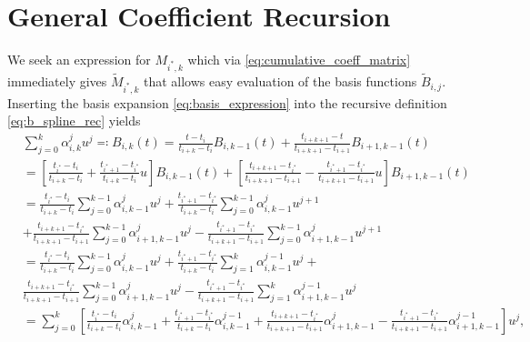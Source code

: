 \section{General Coefficient Recursion}

We seek an expression for $M_{i^*, k}$ which via \eqref{eq:cumulative_coeff_matrix} immediately gives $\tilde M_{i^*, k}$ that allows easy evaluation of the basis functions $\tilde B_{i,j}$. Inserting the basis expansion \eqref{eq:basis_expression} into the recursive definition \eqref{eq:b_spline_rec} yields
\begin{equation*}
  \begin{aligned}
     & \sum_{j=0}^k \alpha^j_{i, k} u^j  \eqcolon B_{i, k}(t) = \frac{t - t_i}{t_{i+k} - t_i} B_{i, k-1}(t) + \frac{t_{i+k+1} - t}{t_{i+k+1} - t_{i+1}} B_{i+1, k-1}(t)                                                                                                                                                                                                \\
     & = \left[\frac{t_{i^*} - t_i}{t_{i+k} - t_i} + \frac{t_{i^*+1} - t_{i^*}}{t_{i+k} - t_i} u \right] B_{i, k-1}(t) + \left[ \frac{t_{i+k+1} - t_{i^*}}{t_{i+k+1} - t_{i+1} } - \frac{t_{i^*+1}-t_{i^*}}{t_{i+k+1} - t_{i+1}} u \right] B_{i+1, k-1}(t)                                                                                                             \\
     & = \frac{t_{i^*} - t_i}{t_{i+k} - t_i} \sum_{j=0}^{k-1} \alpha_{i, k-1}^{j} u^j +  \frac{t_{i^*+1}-t_{i^*}} {t_{i+k} - t_{i}} \sum_{j=0}^{k-1} \alpha^{j}_{i, k-1} u^{j+1}\\
     & + \frac{t_{i+k+1}-t_{i^*}}{t_{i+k+1} - t_{i+1}} \sum_{j=0}^{k-1} \alpha^j_{i+1,k-1} u^{j} - \frac{t_{i^*+1}-t_{i^*}}{t_{i+k+1} - t_{i+1}} \sum_{j=0}^{k-1} \alpha^j_{i+1,k-1} u^{j+1} \\
     & = \frac{t_{i^*} - t_i}{t_{i+k} - t_i} \sum_{j=0}^{k-1} \alpha_{i, k-1}^{j} u^j +  \frac{t_{i^*+1}-t_{i^*}} {t_{i+k} - t_{i}} \sum_{j=1}^{k} \alpha^{j-1}_{i, k-1} u^{j} + \\
     & \frac{t_{i+k+1}-t_{i^*}}{t_{i+k+1} - t_{i+1}} \sum_{j=0}^{k-1} \alpha^j_{i+1,k-1} u^{j} - \frac{t_{i^*+1}-t_{i^*}}{t_{i+k+1} - t_{i+1}} \sum_{j=1}^{k} \alpha^{j-1}_{i+1,k-1} u^{j}   \\
     & = \sum_{j=0}^k \left[ \frac{t_{i^*} - t_i}{t_{i+k} - t_i} \alpha_{i, k-1}^{j} + \frac{t_{i^*+1}-t_{i^*}} {t_{i+k} - t_{i}}  \alpha^{j-1}_{i, k-1} + \frac{t_{i+k+1}-t_{i^*}}{t_{i+k+1} - t_{i+1}} \alpha^j_{i+1,k-1} - \frac{t_{i^*+1}-t_{i^*}}{t_{i+k+1} - t_{i+1}}  \alpha^{j-1}_{i+1,k-1} \right] u^j,
  \end{aligned}
\end{equation*}
